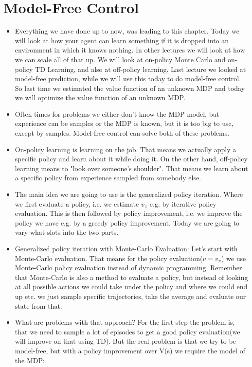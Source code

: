 \documentclass[a4paper]{article}
\begin{document}
\section{Model-Free Control} 
\begin{itemize}
\item Everything we have done up to now, was leading to this chapter. Today we will look at how your agent can learn something if it is dropped into an environment in which it knows nothing. In other lectures we will look at how we can scale all of that up. We will look at on-policy Monte Carlo and on-policy TD Learning, and also at off-policy learning. Last lecture we looked at model-free prediction, while we will use this today to do model-free control. So last time we estimated the value function of an unknown MDP and today we will optimize the value function of an unknown MDP.
\item Often times for problems we either don't know  the MDP model, but experience can be samples or the MDP is known, but it is too big to use, except by samples. Model-free control can solve both of these problems. 
\item On-policy learning is learning on the job. That means we actually apply  a specific policy and learn about it while doing it. On the other hand, off-policy learning means to "look over someone's shoulder". That means we learn about a specific policy from experience sampled from somebody else. 
\item The main idea we are going to use is the generalized policy iteration. Where we first evaluate a policy, i.e. we estimate $v_{\pi}$ e.g. by iterative policy evaluation. This is then followed by policy improvement, i.e. we improve the policy we have e.g. by a greedy policy improvement. Today we are going to vary what slots into the two parts. 
\item Generalized policy iteration with Monte-Carlo Evaluation: Let's start with Monte-Carlo evaluation. That means for the policy evaluation($v = v_{\pi}$) we use Monte-Carlo policy evaluation instead of dynamic programming. Remember that Monte-Carlo is also a method to evaluate a policy, but instead of looking at all possible actions we could take under the policy and where we could end up etc. we just sample specific trajectories, take the average and evaluate our state from that. 
\item What are problems with that approach? For the first step the problem is, that we need to sample a lot of episodes to get a good policy evaluation(we will improve on that using TD). But the real problem is that we try to be model-free, but with a policy improvement over V(s) we require the model of the MDP: $$
$$
\end{itemize}
\end{document}

